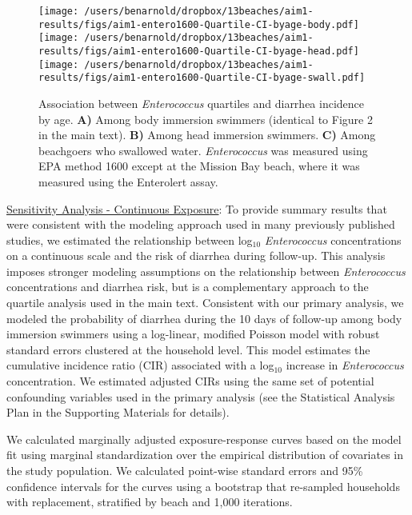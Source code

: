 \documentclass[12pt]{article}\usepackage[]{graphicx}\usepackage[]{color}
\begin{document}
\begin{figure}[h!tb]
\begin{center}
\texttt{[image: /users/benarnold/dropbox/13beaches/aim1-results/figs/aim1-entero1600-Quartile-CI-byage-body.pdf]} \\
\texttt{[image: /users/benarnold/dropbox/13beaches/aim1-results/figs/aim1-entero1600-Quartile-CI-byage-head.pdf]} \\
\texttt{[image: /users/benarnold/dropbox/13beaches/aim1-results/figs/aim1-entero1600-Quartile-CI-byage-swall.pdf]}
\caption{Association between \emph{Enterococcus} quartiles and diarrhea incidence by age. \textbf{A)} Among body immersion swimmers (identical to Figure 2 in the main text). \textbf{B)} Among head immersion swimmers. \textbf{C)} Among beachgoers who swallowed water. \emph{Enterococcus} was measured using EPA method 1600 except at the Mission Bay beach, where it was measured using the Enterolert assay. \label{fig:enterosens}}
\end{center}
\end{figure}


\clearpage
\underline{Sensitivity Analysis - Continuous Exposure}: To provide summary results that were consistent with the modeling approach used in many previously published studies, we estimated the relationship between log$_{10}$ \emph{Enterococcus} concentrations on a continuous scale and the risk of diarrhea during follow-up. This analysis imposes stronger modeling assumptions on the relationship between \emph{Enterococcus} concentrations and diarrhea risk, but is a complementary approach to the quartile analysis used in the main text.  Consistent with our primary analysis, we modeled the probability of diarrhea during the 10 days of follow-up among body immersion swimmers using a log-linear, modified Poisson model with robust standard errors clustered at the household level.  This model estimates the cumulative incidence ratio (CIR) associated with a log$_{10}$ increase in \emph{Enterococcus} concentration.  We estimated adjusted CIRs using the same set of potential confounding variables used in the primary analysis (see the Statistical Analysis Plan in the Supporting Materials for details). 

We calculated marginally adjusted exposure-response curves based on the model fit using marginal standardization over the empirical distribution of covariates in the study population.\supercite{Ahern2009-cv, Muller2014-xn}  We calculated point-wise standard errors and 95\% confidence intervals for the curves using a bootstrap that re-sampled households with replacement, stratified by beach and 1,000 iterations.\supercite{Ahern2009-cv}  
\end{document}
